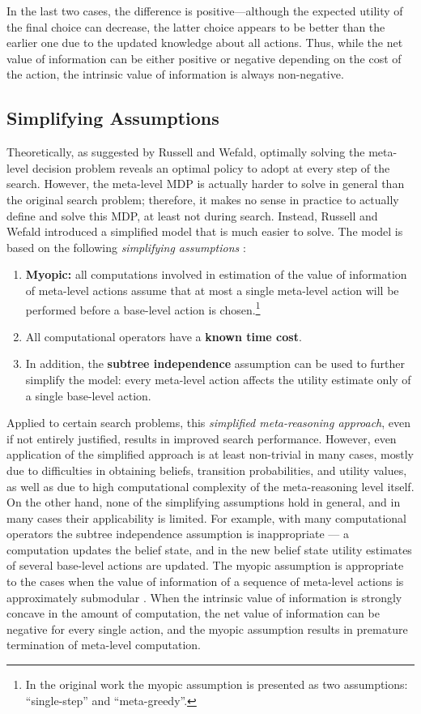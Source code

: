 In the last two cases, the difference is positive---although the
expected utility of the final choice can decrease, the latter
choice appears to be better than the earlier one due
to the updated knowledge about all actions. Thus, while the
net value of information can be either positive or negative depending on
the cost of the action, the intrinsic value of information is always
non-negative.

\subsection{Simplifying Assumptions}
\label{sec:ratimeta-assumptions}

Theoretically, as suggested by Russell and Wefald, optimally solving
the meta-level decision problem reveals an optimal policy to adopt at
every step of the search. However, the meta-level MDP is actually
harder to solve in general than the original search problem;
therefore, it makes no sense in practice to actually define and solve 
this MDP, at least not during search. Instead, Russell and Wefald
introduced a simplified model that is much easier to solve. The model
is based on the following \emph{simplifying
assumptions} \cite{Russell.right}: 
\begin{enumerate}
\item \textbf{Myopic:} all computations involved in estimation of the
value of information of meta-level actions assume that at most a single
meta-level action will be performed before a base-level action is
chosen.\footnote{In the original work \cite{Russell.right} the myopic
assumption is presented as two assumptions: ``single-step'' and
``meta-greedy''.}
\item All computational operators have a \textbf{known time cost}.
\item In addition, the \textbf{subtree independence} assumption can
be used to further simplify the model: every meta-level action
affects the utility estimate only of a single base-level action. 
\end{enumerate}
Applied to certain search problems, this \emph{simplified
meta-reasoning approach}, even if not entirely justified, results in
improved search performance. However, even application of the
simplified approach is at least non-trivial in many cases, mostly due
to difficulties in obtaining beliefs, transition probabilities, and
utility values, as well as due to high computational complexity of the
meta-reasoning level itself. On the other hand, none of the simplifying
assumptions hold in general, and in many cases their applicability is
limited. For example, with many computational operators the subtree
independence assumption is inappropriate --- a computation updates
the belief state, and in the new belief state utility estimates of several
base-level actions are updated. The myopic assumption is appropriate to
the cases when the value of information of a sequence of meta-level
actions is approximately submodular \cite{Guestrin.submodular}. When 
the intrinsic value of information is strongly concave in the amount of
computation, the net value of information can be negative for every
single action, and the myopic assumption results in premature
termination of meta-level computation. 
